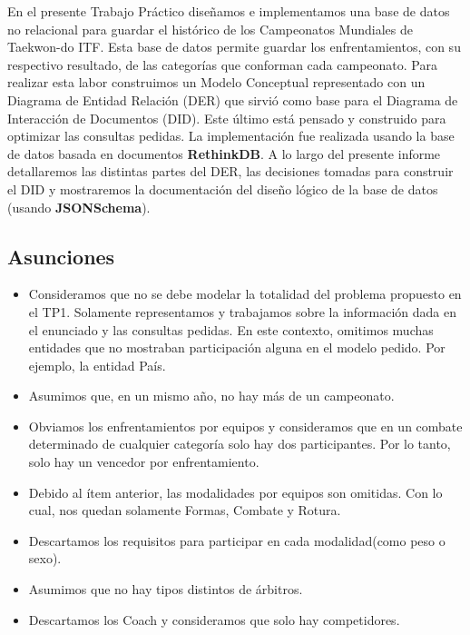 En el presente Trabajo Práctico diseñamos e implementamos una base de datos no relacional para guardar el histórico de los
Campeonatos Mundiales de Taekwon-do ITF. Esta base de datos permite guardar los enfrentamientos, con su respectivo
resultado, de las categorías que conforman cada campeonato. Para realizar esta labor construimos un Modelo Conceptual representado con un
Diagrama de Entidad Relación (DER) que sirvió como base para el Diagrama de Interacción de Documentos (DID). Este último está
pensado y construido para optimizar las consultas pedidas. La implementación fue realizada usando la base de datos basada
en documentos \textbf{RethinkDB}. A lo largo del presente informe detallaremos las distintas partes del DER, las decisiones
tomadas para construir el DID y mostraremos la documentación del diseño lógico de la base de datos (usando \textbf{JSONSchema}).

\subsection{Asunciones}
    \begin{itemize}
    \item Consideramos que no se debe modelar la totalidad del problema propuesto en el TP1. Solamente representamos y trabajamos
    sobre la información dada en el enunciado y las consultas pedidas. En este contexto, omitimos muchas entidades que no mostraban
    participación alguna en el modelo pedido. Por ejemplo, la entidad País.
    \item Asumimos que, en un mismo año, no hay más de un campeonato.
    \item Obviamos los enfrentamientos por equipos y consideramos que en un combate determinado de cualquier categoría solo hay
    dos participantes. Por lo tanto, solo hay un vencedor por enfrentamiento.
    \item Debido al ítem anterior, las modalidades por equipos son omitidas. Con lo cual, nos quedan solamente Formas, Combate y
    Rotura.
    \item Descartamos los requisitos para participar en cada modalidad(como peso o sexo).
    \item Asumimos que no hay tipos distintos de árbitros.
    \item Descartamos los Coach y consideramos que solo hay competidores.
\end{itemize}
